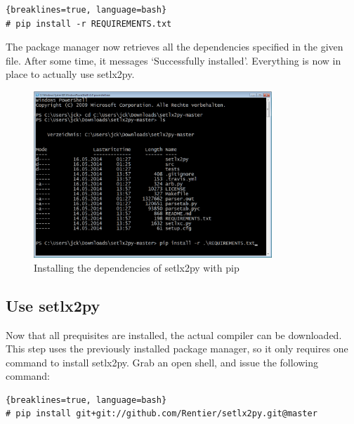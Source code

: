 \begin{lstlisting}{breaklines=true, language=bash}
# pip install -r REQUIREMENTS.txt
\end{lstlisting}

The package manager now retrieves all the dependencies specified in the given file. After some time, it messages `Successfully installed'. Everything is now in place to actually use setlx2py.

\begin{figure}[ht]
    \centering
    \includegraphics[width=0.8\textwidth]{img/install-reqs.png}
    \caption{Installing the dependencies of setlx2py with pip}
    \label{fig:install-req}
\end{figure}

\subsection{Use setlx2py}

Now that all prequisites are installed, the actual compiler can be downloaded. This step uses the previously installed package manager, so it only requires one command to install setlx2py. Grab an open shell, and issue the following command:

\begin{lstlisting}{breaklines=true, language=bash}
# pip install git+git://github.com/Rentier/setlx2py.git@master
\end{lstlisting}